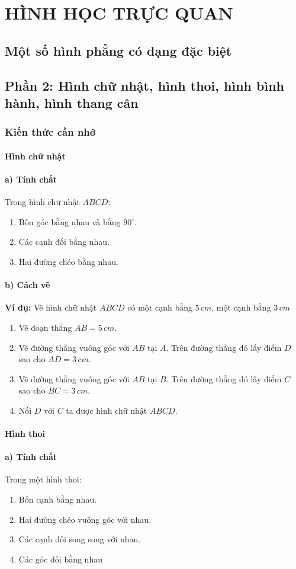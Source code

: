 \def\i{\item}
\graphicspath{{../pictures/vande35/}}
\chapter{HÌNH HỌC TRỰC QUAN}
\section{Một số hình phẳng có dạng đặc biệt} 
\section*{Phần 2: Hình chữ nhật, hình thoi, hình bình hành, hình thang cân}
\subsection{Kiến thức cần nhớ}
\subsubsection{Hình chữ nhật}
\subsubsection*{a) Tính chất}
Trong hình chữ nhật $ABCD$: 
\begin{enumerate}[--, leftmargin=*]
	\i Bốn góc bằng nhau và bằng $90^\circ$. 
	\i Các cạnh đối bằng nhau.
	\i Hai đường chéo bằng nhau.
\end{enumerate}
\subsubsection*{b) Cách vẽ }
\textbf{Ví dụ:} Vẽ hình chữ nhật $ABCD$ có một cạnh bằng $5\, cm$, một cạnh bằng $3 \,cm$ 
\begin{enumerate}[Bước 1:, leftmargin=*]
	\i Vẽ đoạn thẳng $AB = 5\, cm$. 
	\i Vẽ đường thẳng vuông góc với $AB$ tại  $A$. Trên đường thẳng đó lấy điểm $D$ sao cho $AD = 3\, cm$. 
	\i Vẽ đường thẳng vuông góc với $AB$ tại $B$. Trên đường thẳng đó lấy điểm $C$ sao cho $BC = 3\, cm$. 
	\i Nối $D$ với $C$ ta được hình chữ nhật $ABCD$.
\end{enumerate}
\subsubsection{Hình thoi}
\subsubsection*{a) Tính chất}
Trong một hình thoi:
\begin{enumerate}[--, leftmargin=*]
	\i Bốn cạnh bằng nhau. 
	\i Hai đường chéo vuông góc với nhau.
	\i Các cạnh đối song song với nhau.
	\i Các góc đối bằng nhau
\end{enumerate}
